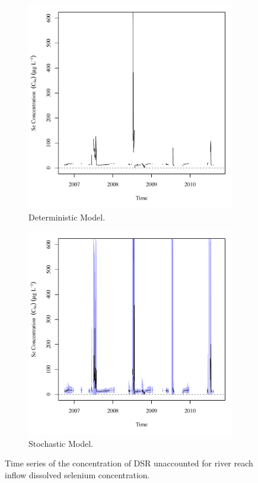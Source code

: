 \begin{linenumbers}
\begin{figure}[htbp]
\centering
	\begin{subfigure}{0.5\textwidth}
		\centering
		\includegraphics[width=0.9\linewidth]{"Figures/Results_DDSR/Balance Cin"}
		\caption{Deterministic Model.}
	\end{subfigure}%
	\begin{subfigure}{0.5\textwidth}
		\centering
		\includegraphics[width=0.9\linewidth]{"Figures/Results_DSR/Balance Cin"}
		\caption{Stochastic Model.}
	\end{subfigure}
	\caption[Time series of the concentration of DSR unaccounted for river reach inflow dissolved selenium concentration.]{Time series of the concentration of DSR unaccounted for river reach inflow dissolved selenium concentration.}
	\label{fig:DSRCin}
\end{figure}


\end{linenumbers}
